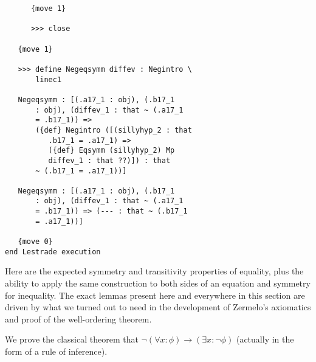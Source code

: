 \documentclass[12pt]{article}
\begin{document}
\begin{verbatim}
      {move 1}

      >>> close

   {move 1}

   >>> define Negeqsymm diffev : Negintro \
       linec1

   Negeqsymm : [(.a17_1 : obj), (.b17_1 
       : obj), (diffev_1 : that ~ (.a17_1 
       = .b17_1)) => 
       ({def} Negintro ([(sillyhyp_2 : that 
          .b17_1 = .a17_1) => 
          ({def} Eqsymm (sillyhyp_2) Mp 
          diffev_1 : that ??)]) : that 
       ~ (.b17_1 = .a17_1))]

   Negeqsymm : [(.a17_1 : obj), (.b17_1 
       : obj), (diffev_1 : that ~ (.a17_1 
       = .b17_1)) => (--- : that ~ (.b17_1 
       = .a17_1))]

   {move 0}
end Lestrade execution
\end{verbatim}

Here are the expected symmetry and transitivity properties of equality, plus the ability to apply the same construction to both sides of an equation and symmetry for inequality.  The exact lemmas present here and everywhere in this section are driven by what we turned out to need in the development of Zermelo's axiomatics and proof of the well-ordering theorem.





We prove the classical theorem that $\neg (\forall x:\phi) \rightarrow (\exists x:\neg\phi)$ (actually in the form of a rule of inference).
\end{document}
